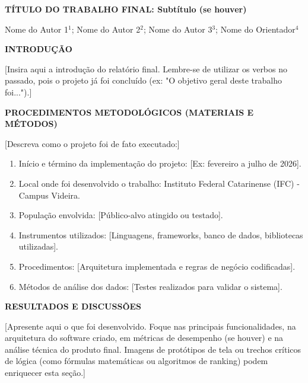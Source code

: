 \documentclass[12pt, a4paper]{article}
\newcommand{\titlesection}[1]{
    \vspace{1.5em}
    \noindent\textbf{\MakeUppercase{#1}}
    \vspace{1em}\par
}
\begin{document}
\onehalfspacing

\begin{center}
    \textbf{TÍTULO DO TRABALHO FINAL: Subtítulo (se houver)}
    
    \vspace{1.5em}
    Nome do Autor 1$^{1}$; Nome do Autor 2$^{2}$; Nome do Autor 3$^{3}$; Nome do Orientador$^{4}$
\end{center}


\titlesection{INTRODUÇÃO}
[Insira aqui a introdução do relatório final. Lembre-se de utilizar os verbos no passado, pois o projeto já foi concluído (ex: "O objetivo geral deste trabalho foi...").]

\titlesection{PROCEDIMENTOS METODOLÓGICOS (materiais e métodos)}

[Descreva como o projeto foi de fato executado:]

\begin{enumerate}[label=\alph*)]
    \item Início e término da implementação do projeto: [Ex: fevereiro a julho de 2026].
    \item Local onde foi desenvolvido o trabalho: Instituto Federal Catarinense (IFC) - Campus Videira.
    \item População envolvida: [Público-alvo atingido ou testado].
    \item Instrumentos utilizados: [Linguagens, frameworks, banco de dados, bibliotecas utilizadas].
    \item Procedimentos: [Arquitetura implementada e regras de negócio codificadas].
    \item Métodos de análise dos dados: [Testes realizados para validar o sistema].
\end{enumerate}

\titlesection{RESULTADOS E DISCUSSÕES}
[Apresente aqui o que foi desenvolvido. Foque nas principais funcionalidades, na arquitetura do software criado, em métricas de desempenho (se houver) e na análise técnica do produto final. Imagens de protótipos de tela ou trechos críticos de lógica (como fórmulas matemáticas ou algoritmos de ranking) podem enriquecer esta seção.]
\end{document}

